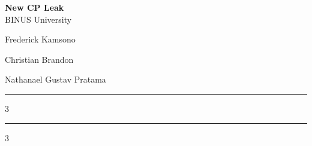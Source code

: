 \documentclass[hidelinks,8pt,a4paper]{extarticle}
\newcommand{\teamname}{New CP Leak}
\newcommand{\university}{BINUS University}
\newcommand{\memberone}{Frederick Kamsono}
\newcommand{\membertwo}{Christian Brandon}
\newcommand{\memberthree}{Nathanael Gustav Pratama}
\newcommand{\teammember}[2]{%
  \begin{minipage}[t]{0.32\linewidth}
    \centering
    {\small #1}%
  \end{minipage}%
}
\newcommand{\maketeamheader}{%
  {\centering
    {\large\textbf{\teamname}}\\[0.5mm]
    {\small\university}\\[1.5mm]
    \teammember{\memberone}{\handleone}\hfill
    \teammember{\membertwo}{\handletwo}\hfill
    \teammember{\memberthree}{\handlethree}\par
  }
  \vskip1.5mm
  \hrule
  \vskip1mm
}
\begin{document}
\begin{landscape}

\maketeamheader

\begin{multicols}{3}
\tableofcontents
\end{multicols}

\vskip2mm
\hrule

\begin{multicols*}{3}

% 
\end{multicols*}

\end{landscape}

\end{document}
